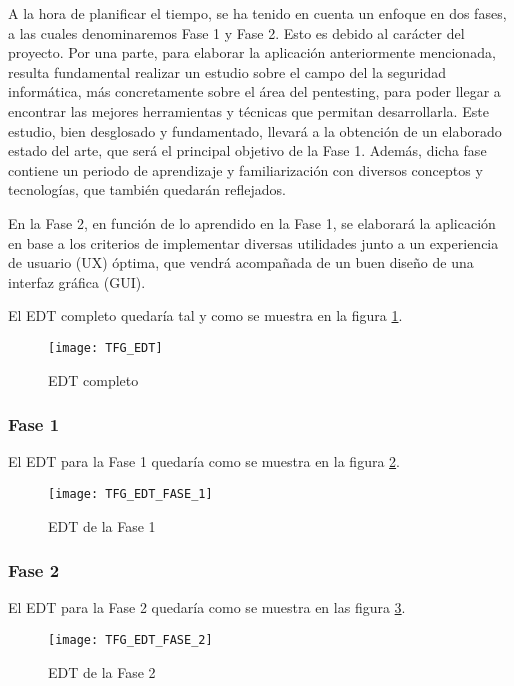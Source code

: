 A la hora de planificar el tiempo, se ha tenido en cuenta un enfoque en dos fases, a las cuales denominaremos Fase 1 y Fase 2. Esto es debido al carácter del proyecto. Por una parte, para elaborar la aplicación anteriormente mencionada, resulta fundamental realizar un estudio sobre el campo del la seguridad informática, más concretamente sobre el área del pentesting, para poder llegar a encontrar las mejores herramientas y técnicas que permitan desarrollarla. Este estudio, bien desglosado y fundamentado, llevará a la obtención de un elaborado estado del arte, que será el principal objetivo de la Fase 1. Además, dicha fase contiene un periodo de aprendizaje y familiarización con diversos conceptos y tecnologías, que también quedarán reflejados.

En la Fase 2, en función de lo aprendido en la Fase 1, se elaborará la aplicación en base a los criterios de implementar diversas utilidades junto a un experiencia de usuario (UX) óptima, que vendrá acompañada de un buen diseño de una interfaz gráfica (GUI).

El EDT completo quedaría tal y como se muestra en la figura \ref{fig:edt}.

\begin{landscape}
	
	\begin{figure}[H]
		\centering
		\texttt{[image: TFG\_EDT]}
		\caption{EDT completo}
		\label{fig:edt}
	\end{figure}
	
	\clearpage
	
	\subsubsection{Fase 1}
	El EDT para la Fase 1 quedaría como se muestra en la figura \ref{fig:edt1}.
	
	\begin{figure}[H]
		\centering
		\texttt{[image: TFG\_EDT\_FASE\_1]}
		\caption{EDT de la Fase 1}
		\label{fig:edt1}
	\end{figure}

\end{landscape}

\subsubsection{Fase 2}
El EDT para la Fase 2 quedaría como se muestra en las figura \ref{fig:edt2}.

\begin{figure}[H]
	\centering
	\texttt{[image: TFG\_EDT\_FASE\_2]}
	\caption{EDT de la Fase 2}
	\label{fig:edt2}
\end{figure}

